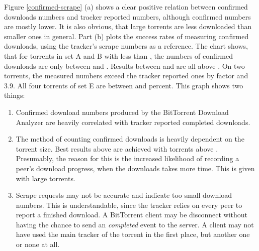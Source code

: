 \documentclass[10pt, a4paper, twoside, headsepline]{scrbook}
\renewcommand{\_}{\origunderscore\allowbreak}
\begin{document}
Figure \ref{confirmed-scrape} (a) shows a clear positive relation between confirmed downloads numbers and tracker reported numbers, although confirmed numbers are mostly lower. It is also obvious, that large torrents are less downloaded than smaller ones in general. Part (b) plots the success rates of measuring confirmed downloads, using the tracker's scrape numbers as a reference. The chart shows, that for torrents in set A and B with less than , the numbers of confirmed downloads are only between  and . Results between  and  are all above . On two torrents, the measured numbers exceed the tracker reported ones by factor  and {3.9}. All four torrents of set E are between  and  percent. This graph shows two things:
\begin{enumerate}
\item Confirmed download numbers produced by the BitTorrent Download Analyzer are heavily correlated with tracker reported completed downloads.
\item The method of counting confirmed downloads is heavily dependent on the torrent size. Best results above  are achieved with torrents above . Presumably, the reason for this is the increased likelihood of recording a peer's download progress, when the downloads takes more time. This is given with large torrents.
\item Scrape requests may not be accurate and indicate too small download numbers. This is understandable, since the tracker relies on every peer to report a finished download. A BitTorrent client may be disconnect without having the chance to send an \emph{completed} event to the server. A client may not have used the main tracker of the torrent in the first place, but another one or none at all.
\end{enumerate}
\end{document}
